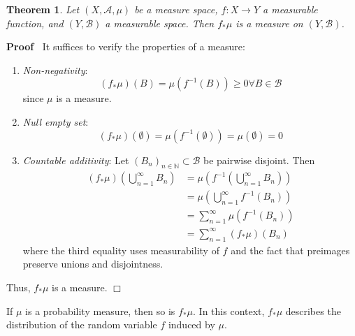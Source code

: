 \documentclass{article}
\newcommand{\tmem}[1]{{\em #1\/}}
\newenvironment{proof}{\noindent\textbf{Proof\ }}{\hspace*{\fill}$\Box$\medskip}
\newtheorem{theorem}{Theorem}
\begin{document}
\begin{theorem}
  Let $(X, \mathcal{A}, \mu)$ be a measure space, $f : X \to Y$ a measurable
  function, and $(Y, \mathcal{B})$ a measurable space. Then $f_{\ast} \mu$ is
  a measure on $(Y, \mathcal{B})$.
\end{theorem}

\begin{proof}
  It suffices to verify the properties of a measure:
  \begin{enumerate}
    \item {\tmem{Non-negativity}}:
    \begin{equation}
      (f_{\ast} \mu) (B) = \mu (f^{- 1} (B)) \geq 0 \forall B \in \mathcal{B}
    \end{equation}
    since $\mu$ is a measure.
    
    \item {\tmem{Null empty set}}:
    \begin{equation}
      (f_{\ast} \mu) (\emptyset) = \mu (f^{- 1} (\emptyset)) = \mu (\emptyset)
      = 0
    \end{equation}
    \item {\tmem{Countable additivity}}: Let $(B_n)_{n \in \mathbb{N}} \subset
    \mathcal{B}$ be pairwise disjoint. Then
    \begin{equation}
      \begin{array}{cl}
        (f_{\ast} \mu) \left( \bigcup_{n = 1}^{\infty} B_n \right) & = \mu
        \left( f^{- 1} \left( \bigcup_{n = 1}^{\infty} B_n \right) \right)\\
        & = \mu \left( \bigcup_{n = 1}^{\infty} f^{- 1} (B_n) \right)\\
        & = \sum_{n = 1}^{\infty} \mu (f^{- 1} (B_n))\\
        & = \sum_{n = 1}^{\infty} (f_{\ast} \mu) (B_n)
      \end{array}
    \end{equation}
    where the third equality uses measurability of $f$ and the fact that
    preimages preserve unions and disjointness.
  \end{enumerate}
  Thus, $f_{\ast} \mu$ is a measure.
\end{proof}

\begin{remark}
  If $\mu$ is a probability measure, then so is $f_{\ast} \mu$. In this
  context, $f_{\ast} \mu$ describes the distribution of the random variable
  $f$ induced by $\mu$.
\end{remark}
\end{document}
